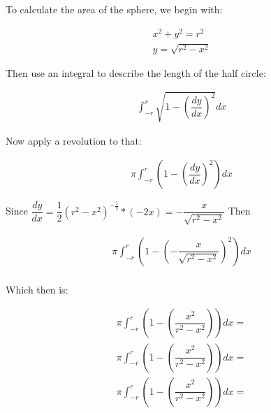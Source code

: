 
To calculate the area of the sphere, we begin with:

\begin{align}
    x^2+y^2=r^2 \\
    y=\sqrt{r^2-x^2}
\end{align}

Then use an integral to describe the length of the half circle:

\begin{align}
    \int^{r}_{-r} \sqrt{1-(\dfrac{dy}{dx})^2} dx
\end{align}

Now apply a revolution to that:

\begin{align}
    \pi\int^{r}_{-r} \left( 1- \left(\dfrac{dy}{dx}\right)^2 \right) dx
\end{align}

Since $ \dfrac{dy}{dx} = \dfrac{1}{2} \left( r^2 - x^2 \right)^{-\frac{1}{2}} * (-2x) = -\dfrac{x}{\sqrt{r^2-x^2}}$ Then

\begin{align}
    \pi\int^{r}_{-r} \left( 1- \left(-\dfrac{x}{\sqrt{r^2-x^2}}\right)^2 \right) dx \\
\end{align}

Which then is:

\begin{align}
    \pi \int_{-r}^{r} \left( 1 - \left( \dfrac{x^2}{r^2-x^2} \right) \right) dx = \\
    \pi \int_{-r}^{r} \left( 1 - \left( \dfrac{x^2}{r^2-x^2} \right) \right) dx = \\
    \pi \int_{-r}^{r} \left( 1 - \left( \dfrac{x^2}{r^2-x^2} \right) \right) dx =
\end{align}
